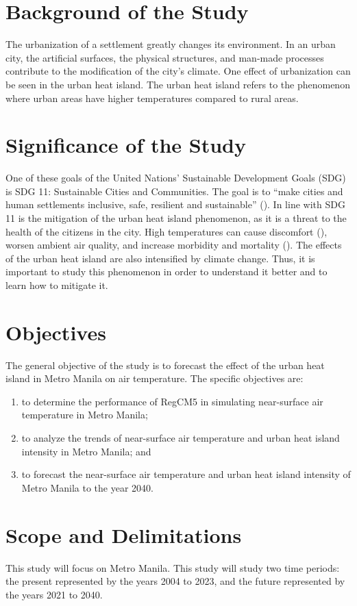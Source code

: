 \section{Background of the Study}
	The urbanization of a settlement greatly changes its environment.
	In an urban city, the artificial surfaces, the physical structures, and man-made processes contribute to the modification of the city's climate.
	One effect of urbanization can be seen in the urban heat island.
	The urban heat island refers to the phenomenon where urban areas have higher temperatures compared to rural areas.
	
\section{Significance of the Study}
	One of these goals of the United Nations' Sustainable Development Goals (SDG) is SDG 11: Sustainable Cities and Communities.
	The goal is to ``make cities and human settlements inclusive, safe, resilient and sustainable'' (\cite{UN2015}).
	In line with SDG 11 is the mitigation of the urban heat island phenomenon, as it is a threat to the health of the citizens in the city.
	High temperatures can cause discomfort (\cite{Bhati2018}), worsen ambient air quality, and increase morbidity and mortality (\cite {Khan2021}).
	The effects of the urban heat island are also intensified by climate change.
	Thus, it is important to study this phenomenon in order to understand it better and to learn how to mitigate it.	

\section{Objectives}
	The general objective of the study is to forecast the effect of the urban heat island in Metro Manila on air temperature.
	The specific objectives are:
	\begin{enumerate}
		\item to determine the performance of RegCM5 in simulating near-surface air temperature in Metro Manila;
		\item to analyze the trends of near-surface air temperature and urban heat island intensity in Metro Manila; and
		\item to forecast the near-surface air temperature and urban heat island intensity of Metro Manila to the year 2040.
		
	\end{enumerate}
	

\section{Scope and Delimitations}
	This study will focus on Metro Manila.
	This study will study two time periods: 
		the present represented by the years 2004 to 2023, 
		and the future represented by the years 2021 to 2040.
	
